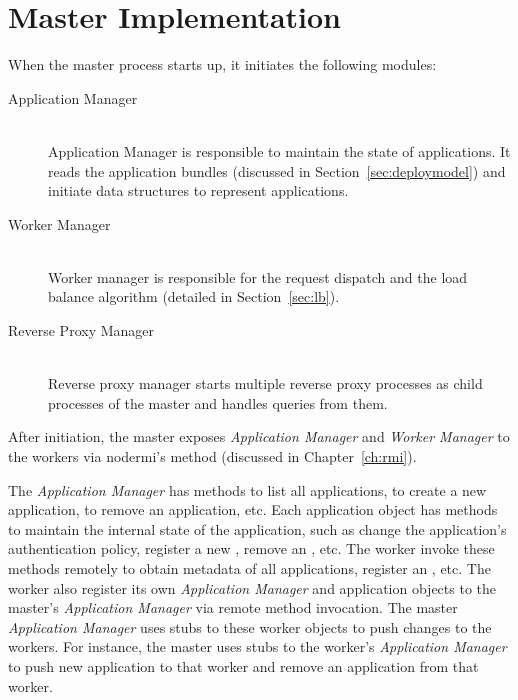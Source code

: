 \section{Master Implementation}

When the master process starts up, it initiates the following modules:

\begin{description}
\item[Application Manager] \hfill \\
Application Manager is responsible to maintain the state of applications. It
reads the application bundles (discussed in Section~\ref{sec:deploymodel}) and
initiate data structures to represent applications.

\item[Worker Manager] \hfill \\
Worker manager is responsible for the request dispatch
and the load balance algorithm (detailed in Section~\ref{sec:lb}).

\item[Reverse Proxy Manager] \hfill \\
Reverse proxy manager starts multiple reverse proxy processes as child
processes of the master and handles queries from them.
\end{description}

After initiation, the master exposes \emph{Application Manager} and
\emph{Worker Manager} to the workers via nodermi's   method
(discussed in Chapter~\ref{ch:rmi}).

The \emph{Application Manager} has
methods to list all applications, to create a new application, to  remove an
application, etc. Each application object has methods to maintain the internal
state of the application, such as change the application's authentication
policy, register a new \appins, remove an \appins, etc. The worker invoke
these methods remotely to obtain metadata of all applications, register an
\appins, etc. The worker also register its own \emph{Application Manager}  and
application objects to the master's \emph{Application Manager}  via remote
method invocation. The master \emph{Application Manager}  uses stubs to these
worker objects to push changes to the  workers. For instance, the master uses
stubs to the worker's \emph{Application Manager} to push new application to
that worker and remove an application from that worker.

